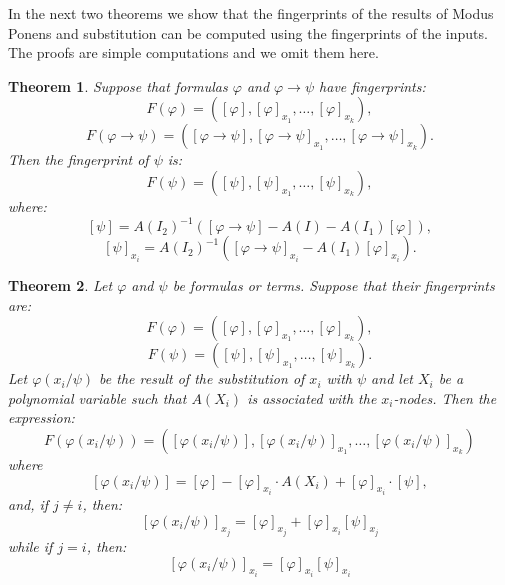 \documentclass{article}
\theoremstyle{plain}
\newtheorem{theorem}{Theorem}[section]
\theoremstyle{definition}
\begin{document}
 In the next two theorems we show that the fingerprints of the results of Modus Ponens and substitution can be computed using the fingerprints of the inputs. The proofs are simple computations and we omit them here.
 
\begin{theorem}
Suppose that formulas $\varphi$ and $\varphi \rightarrow \psi$ have fingerprints:
$$F(\varphi) = ([\varphi], [\varphi]_{x_1}, \dots, [\varphi]_{x_k}),$$
$$F(\varphi \rightarrow \psi) = ([\varphi \rightarrow \psi], [\varphi \rightarrow \psi]_{x_1}, \dots, [\varphi \rightarrow \psi]_{x_k}).$$
Then the fingerprint of $\psi$ is:
$$F(\psi) = ([\psi], [\psi]_{x_1}, \dots, [\psi]_{x_k}),$$
where:
$$[\psi] = {A(I_2)}^{-1} \left ([\varphi \rightarrow \psi] - A(I) - A(I_1)[\varphi]\right ),  $$
$$[\psi]_{x_i} = {A(I_2)}^{-1} \left ([\varphi \rightarrow \psi]_{x_i}  - A(I_1)[\varphi]_{x_i}\right ).$$
\end{theorem} 

\begin{theorem}
    Let $\varphi$ and $\psi$ be formulas or terms. Suppose that their fingerprints are: 
    $$F(\varphi) = ([\varphi], [\varphi]_{x_1}, \dots, [\varphi]_{x_k}),$$
    $$F(\psi) = ([\psi], [\psi]_{x_1}, \dots, [\psi]_{x_k}).$$
    Let $\varphi(x_i/\psi) $ be the result of the substitution of
    $x_i$ with $\psi$ and let $X_i$ be a polynomial variable such that $A(X_i)$ is associated with the $x_i$-nodes.  Then the expression:
    $$F(\varphi(x_i/\psi)) = ([\varphi(x_i/\psi)], [\varphi(x_i/\psi)]_{x_1}, \dots, [\varphi(x_i/\psi)]_{x_k})$$
    where
    $$[\varphi(x_i/\psi)] = [\varphi] - [\varphi]_{x_i} \cdot A(X_i) + [\varphi]_{x_i} \cdot [\psi], $$ 
    and, if $j \neq i$, then:
    $$[\varphi(x_i/\psi)]_{x_j} = [\varphi]_{x_j} + [\varphi]_{x_i} [\psi]_{x_j}$$
    while if $j = i$, then:
    $$[\varphi(x_i/\psi)]_{x_i} = [\varphi]_{x_i} [\psi]_{x_i}$$
\end{theorem} 
\end{document}
